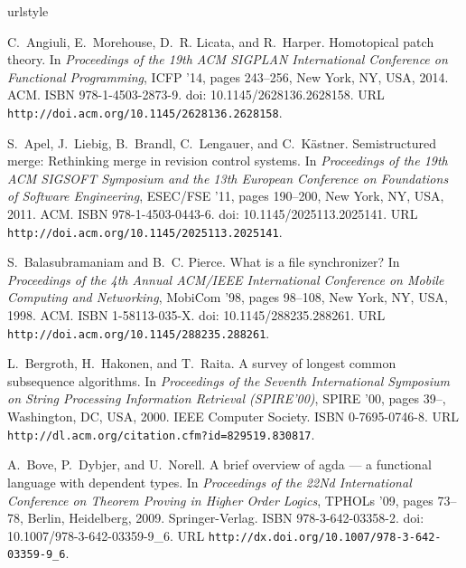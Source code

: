 \documentclass{sigplanconf}
\theoremstyle{plain}
\begin{document}
\begin{thebibliography}{22}
\providecommand{\natexlab}[1]{#1}
\providecommand{\url}[1]{\texttt{#1}}
\expandafter\ifx\csname urlstyle\endcsname\relax
  \providecommand{\doi}[1]{doi: #1}\else
  \providecommand{\doi}{doi: \begingroup \urlstyle{rm}\Url}\fi

C.~Angiuli, E.~Morehouse, D.~R. Licata, and R.~Harper.
\newblock Homotopical patch theory.
\newblock In \emph{Proceedings of the 19th ACM SIGPLAN International Conference
  on Functional Programming}, ICFP '14, pages 243--256, New York, NY, USA,
  2014. ACM.
\newblock ISBN 978-1-4503-2873-9.
\newblock \doi{10.1145/2628136.2628158}.
\newblock URL \url{http://doi.acm.org/10.1145/2628136.2628158}.

S.~Apel, J.~Liebig, B.~Brandl, C.~Lengauer, and C.~K\"{a}stner.
\newblock Semistructured merge: Rethinking merge in revision control systems.
\newblock In \emph{Proceedings of the 19th ACM SIGSOFT Symposium and the 13th
  European Conference on Foundations of Software Engineering}, ESEC/FSE '11,
  pages 190--200, New York, NY, USA, 2011. ACM.
\newblock ISBN 978-1-4503-0443-6.
\newblock \doi{10.1145/2025113.2025141}.
\newblock URL \url{http://doi.acm.org/10.1145/2025113.2025141}.

S.~Balasubramaniam and B.~C. Pierce.
\newblock What is a file synchronizer?
\newblock In \emph{Proceedings of the 4th Annual ACM/IEEE International
  Conference on Mobile Computing and Networking}, MobiCom '98, pages 98--108,
  New York, NY, USA, 1998. ACM.
\newblock ISBN 1-58113-035-X.
\newblock \doi{10.1145/288235.288261}.
\newblock URL \url{http://doi.acm.org/10.1145/288235.288261}.

L.~Bergroth, H.~Hakonen, and T.~Raita.
\newblock A survey of longest common subsequence algorithms.
\newblock In \emph{Proceedings of the Seventh International Symposium on String
  Processing Information Retrieval (SPIRE'00)}, SPIRE '00, pages 39--,
  Washington, DC, USA, 2000. IEEE Computer Society.
\newblock ISBN 0-7695-0746-8.
\newblock URL \url{http://dl.acm.org/citation.cfm?id=829519.830817}.

A.~Bove, P.~Dybjer, and U.~Norell.
\newblock A brief overview of agda --- a functional language with dependent
  types.
\newblock In \emph{Proceedings of the 22Nd International Conference on Theorem
  Proving in Higher Order Logics}, TPHOLs '09, pages 73--78, Berlin,
  Heidelberg, 2009. Springer-Verlag.
\newblock ISBN 978-3-642-03358-2.
\newblock \doi{10.1007/978-3-642-03359-9_6}.
\newblock URL \url{http://dx.doi.org/10.1007/978-3-642-03359-9_6}.


\end{thebibliography}
\end{document}
